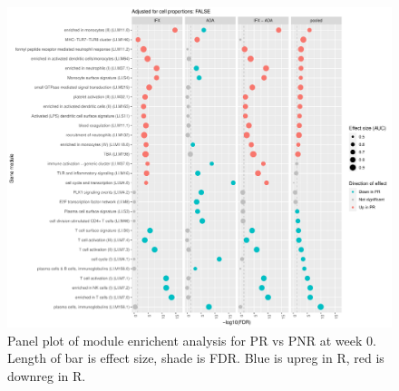 \begin{outline}

\begin{figure}
    \centering
    \includegraphics[width=1.0\textwidth,page=1]{mainmatter/figures/chapter_04/plot_gene_set_enrichment.tmodCERNO_panelplot_reversed_C_1RI_1NI,C_1RA_1NA,C_(1RI_1NI)_(1RA_1NA),C_1R_1N.cell_prop_correction_FALSE.pdf}
    \caption{Panel plot of module enrichent analysis for PR vs PNR at week 0. Length of bar is effect size, shade is FDR. Blue is upreg in R, red is downreg in R.}
    \label{fig:multipants_dge_panelPlot_week_0_R_N_cellPropF}
\end{figure}


\end{outline}
